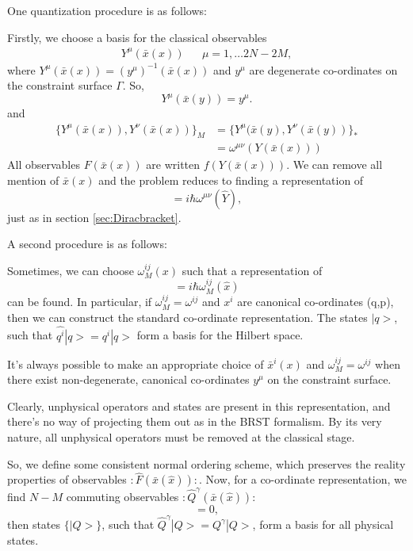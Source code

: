 \documentclass[a4paper,12pt]{article}
\theoremstyle{definition}
\theoremstyle{remark}
\numberwithin{equation}{section}
\newcommand{\ga}{\gamma}
\newcommand{\de}{\delta}
\newcommand{\om}{\omega}
\newcommand{\xh}{\hat{x}}
\newcommand{\Yh}{\hat{Y}}
\newcommand{\Qh}{\hat{Q}}
\newcommand{\bx}{\bar{x}}
\begin{document}
One quantization procedure is as follows:

Firstly, we choose a basis for the classical observables
\begin{eqnarray}
Y^\mu(\bx(x)) && \mu=1,\ldots 2N-2M,
\end{eqnarray}
where $Y^\mu(\bx(x))=(y^\mu)^{-1}(\bx(x))$ and $y^\mu$ are
degenerate co-ordinates on the constraint surface $\Gamma$. So,
\begin{equation}
Y^\mu(\bx(y))=y^\mu.
\end{equation}
and
\begin{equation}
\begin{split}
\{Y^\mu(\bx(x)),Y^\nu(\bx(x))\}_M&=
\{Y^{\mu}(\bx(y),Y^{\nu}(\bx(y))\}_*\\
&=\om^{\mu\nu}(Y(\bx(x)))
\end{split}
\end{equation}
All observables $F(\bx(x))$ are written $f(Y(\bx(x)))$. We can
remove all mention of $\bx(x)$ and the problem reduces to finding a
representation of
\begin{equation}
[\Yh^\mu, \Yh^\nu]=i \hbar \om^{\mu\nu}(\Yh),
\end{equation}
just as in section \ref{sec:Diracbracket}.

A second procedure is as follows:

Sometimes, we can choose $\om_M^{ij}(x)$ such that a representation
of
\begin{equation}
[\xh^i,\xh^j]=i\hbar \om^{ij}_M(\xh)
\end{equation}
can be found. In particular, if $\om_M^{ij}=\om^{ij}$ and $x^i$ are
canonical co-ordinates (q,p), then we can construct the standard
co-ordinate representation. The states $|q>$, such that
$\hat{q^i}|q>=q^i|q>$ form a basis for the Hilbert space.

It's always possible to  make an appropriate choice of $\bx^i(x)$
and $\om_M^{ij}=\om^{ij}$ when there exist non-degenerate,
canonical co-ordinates $y^\mu$ on the constraint surface.

Clearly, unphysical operators and states are present in this
representation, and there's no way of projecting them out as in the
BRST formalism. By its very nature, all unphysical operators must
be removed at the classical stage.

So, we define some consistent normal ordering scheme, which
preserves the reality properties of observables
$:\hat{F}(\bx(\xh)):$. Now, for a co-ordinate representation, we
find $N-M$ commuting observables $:\Qh^{\ga}(\bx(\xh)):$
\begin{equation}
[:\Qh^{\ga}(\bx(\xh)):\, , \, :\Qh^{\de}(\bx(\xh)):]=0,
\end{equation}
then states $\{|Q>\}$, such that $\Qh^{\ga}|Q>=Q^{\ga}|Q>$, form a
basis for all physical states.
\end{document}

